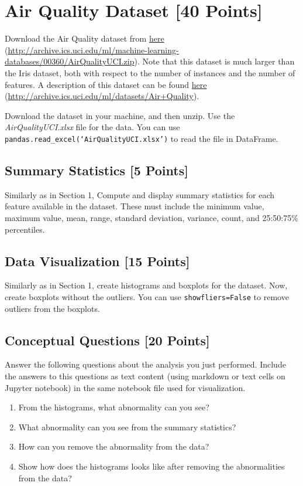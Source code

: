 \documentclass[letter-paper,12pt]{article} %
\begin{document}
\section{Air Quality Dataset [40 Points]}
Download the Air Quality dataset from \href{http://archive.ics.uci.edu/ml/machine-learning-databases/00360/AirQualityUCI.zip}{here} (\url{http://archive.ics.uci.edu/ml/machine-learning-databases/00360/AirQualityUCI.zip}). Note that this dataset is much larger than
the Iris dataset, both with respect to the number of instances and the number of features. A description of this dataset can be found \href{http://archive.ics.uci.edu/ml/datasets/Air+Quality}{here} (\url{http://archive.ics.uci.edu/ml/datasets/Air+Quality}).

Download the dataset in your machine, and then unzip. Use the \textit{AirQualityUCI.xlsx} file for the data. You can use \texttt{pandas.read\_excel(`AirQualityUCI.xlsx')} to read the file in DataFrame. 

\subsection{Summary Statistics [5 Points]}
Similarly as in Section 1, Compute and display summary statistics for each feature available in the dataset. These must include the minimum value, maximum value, mean, range, standard deviation, variance, count, and 25:50:75\% percentiles.

\subsection{Data Visualization [15 Points]}
Similarly as in Section 1, create histograms and boxplots for the dataset. 
Now, create boxplots without the outliers. You can use \texttt{showfliers=False} to remove outliers from the boxplots. 

\subsection{Conceptual Questions [20 Points]}
Answer the following questions about the analysis you just performed. Include the answers to this questions as text content (using markdown or text cells on Jupyter notebook) in the same notebook file used for visualization.
\begin{enumerate}
    \item From the histograms, what abnormality can you see? 
    \item What abnormality can you see from the summary statistics?
    \item How can you remove the abnormality from the data? 
    \item Show how does the histograms looks like after removing the abnormalities from the data?
    
\end{enumerate}
\end{document}
